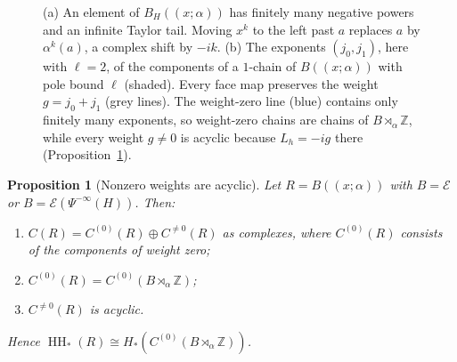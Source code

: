 \documentclass[11pt,oneside,reqno]{article}
\DeclareMathOperator{\HH}{HH}
\newcommand{\Z}{\mathbb Z}
\newcommand{\cE}{\mathcal E}
\theoremstyle{plain}
\newtheorem{proposition}[theorem]{Proposition}
\theoremstyle{definition}
\theoremstyle{remark}
\newcommand{\Lser}[1]{(\!(#1)\!)}
\begin{document}
\begin{figure}[tbp]
\caption[Twisted Laurent series and the weight grading]{(a) An element of
\(B_H\Lser{x;\alpha}\) has finitely many negative powers and an infinite
Taylor tail. Moving \(x^k\) to the left past \(a\) replaces \(a\) by
\(\alpha^k(a)\), a complex shift by \(-ik\). (b) The exponents
\((j_0,j_1)\), here with \(\ell=2\), of the components of a \(1\)-chain of
\(B\Lser{x;\alpha}\) with pole bound \(\ell\) (shaded). Every face map
preserves the weight \(g=j_0+j_1\) (grey lines). The weight-zero line
(blue) contains only finitely many exponents, so weight-zero chains are
chains of \(B\rtimes_\alpha\Z\), while every weight \(g\neq0\) is acyclic
because \(L_h=-ig\) there (Proposition~\ref{prop:weights}).}
\label{fig:weights}
\end{figure}

\begin{proposition}[Nonzero weights are acyclic]\label{prop:weights}
Let \(R=B\Lser{x;\alpha}\) with \(B=\cE\) or \(B=\cE(\Psi^{-\infty}(H))\). Then:
\begin{enumerate}
\item[(a)] \(C(R)=C^{(0)}(R)\oplus C^{\neq0}(R)\) as complexes, where
\(C^{(0)}(R)\) consists of the components of weight zero;
\item[(b)] \(C^{(0)}(R)=C^{(0)}(B\rtimes_\alpha\Z)\);
\item[(c)] \(C^{\neq0}(R)\) is acyclic.
\end{enumerate}
Hence \(\HH_*(R)\cong H_*(C^{(0)}(B\rtimes_\alpha\Z))\).
\end{proposition}
\end{document}
